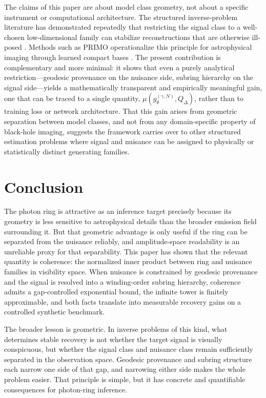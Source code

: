 \documentclass[11pt,a4paper]{article}
\theoremstyle{definition}
\theoremstyle{remark}
\begin{document}
The claims of this paper are about model class geometry, not about a specific instrument or computational architecture. The structured inverse-problem literature has demonstrated repeatedly that restricting the signal class to a well-chosen low-dimensional family can stabilize reconstructions that are otherwise ill-posed \citep{Candes2006Robust,Donoho2006CS,Candes2008RIP,Arridge2019Survey,Adler2018LPD,Ongie2020Survey}. Methods such as PRIMO operationalize this principle for astrophysical imaging through learned compact bases \citep{Medeiros2023PRIMO,Psaltis2024PRIMOTheory}. The present contribution is complementary and more minimal: it shows that even a purely analytical restriction---geodesic provenance on the nuisance side, subring hierarchy on the signal side---yields a mathematically transparent and empirically meaningful gain, one that can be traced to a single quantity, $\mu(g_\theta^{(\gamma,N)}, Q_\Delta)$, rather than to training loss or network architecture. That this gain arises from geometric separation between model classes, and not from any domain-specific property of black-hole imaging, suggests the framework carries over to other structured estimation problems where signal and nuisance can be assigned to physically or statistically distinct generating families.

\section{Conclusion}

The photon ring is attractive as an inference target precisely because its geometry is less sensitive to astrophysical details than the broader emission field surrounding it. But that geometric advantage is only useful if the ring can be separated from the nuisance reliably, and amplitude-space readability is an unreliable proxy for that separability. This paper has shown that the relevant quantity is coherence: the normalized inner product between ring and nuisance families in visibility space. When nuisance is constrained by geodesic provenance and the signal is resolved into a winding-order subring hierarchy, coherence admits a gap-controlled exponential bound, the infinite tower is finitely approximable, and both facts translate into measurable recovery gains on a controlled synthetic benchmark.

The broader lesson is geometric. In inverse problems of this kind, what determines stable recovery is not whether the target signal is visually conspicuous, but whether the signal class and nuisance class remain sufficiently separated in the observation space. Geodesic provenance and subring structure each narrow one side of that gap, and narrowing either side makes the whole problem easier. That principle is simple, but it has concrete and quantifiable consequences for photon-ring inference.



\end{document}
